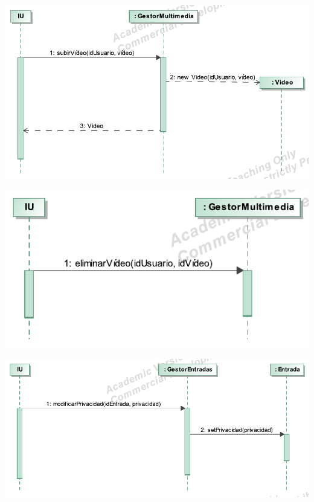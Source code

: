 \documentclass[12pt, a4paper, titlepage]{article}
\begin{document}
\begin{center}
	\includegraphics{Imagenes/OperacionSubirVideo}
\end{center}

\begin{center}
	\includegraphics{Imagenes/OperacionEliminarVideo}
\end{center}

\begin{center}
	\includegraphics{Imagenes/OperacionModificarPrivacidad}
\end{center}
\end{document}

